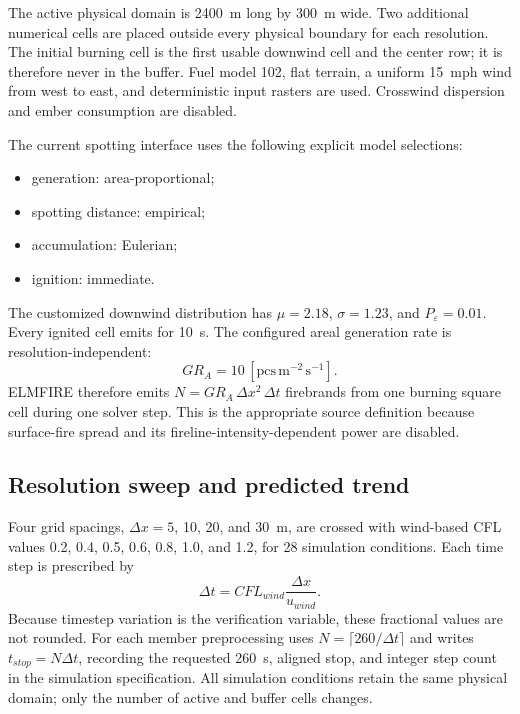 The active physical domain is \SI{2400}{m} long by \SI{300}{m} wide.  Two
additional numerical cells are placed outside every physical boundary for
each resolution.  The initial burning cell is the first usable downwind cell
and the center row; it is therefore never in the buffer.  Fuel model 102,
flat terrain, a uniform \SI{15}{mph} wind from west to east, and deterministic
input rasters are used.  Crosswind dispersion and ember consumption are
disabled.

The current spotting interface uses the following explicit model selections:
\begin{itemize}
  \item generation: area-proportional;
  \item spotting distance: empirical;
  \item accumulation: Eulerian;
  \item ignition: immediate.
\end{itemize}
The customized downwind distribution has $\mu=2.18$, $\sigma=1.23$, and
$P_\varepsilon=0.01$.  Every ignited cell emits for \SI{10}{s}.  The configured areal generation rate is resolution-independent:
\begin{equation}
  GR_A=10\,[\mathrm{pcs\,m^{-2}\,s^{-1}}].
\end{equation}
ELMFIRE therefore emits \(N=GR_A\,\Delta x^2\,\Delta t\) firebrands from one burning square cell during one solver step. This is the appropriate source definition because surface-fire spread and its fireline-intensity-dependent power are disabled.

\subsection{Resolution sweep and predicted trend}
Four grid spacings, $\Delta x=5$, 10, 20, and \SI{30}{m}, are crossed with
wind-based CFL values 0.2, 0.4, 0.5, 0.6, 0.8, 1.0, and 1.2, for 28 simulation conditions.  Each
time step is prescribed by
\begin{equation}
  \Delta t=CFL_{wind}\frac{\Delta x}{u_{wind}}.
\end{equation}
Because timestep variation is the verification variable, these fractional values are not rounded. For each member preprocessing uses \(N=\lceil260/\Delta t\rceil\) and writes \(t_{stop}=N\Delta t\), recording the requested 260~s, aligned stop, and integer step count in the simulation specification. All simulation conditions retain the same physical domain; only the number of active and
buffer cells changes.

